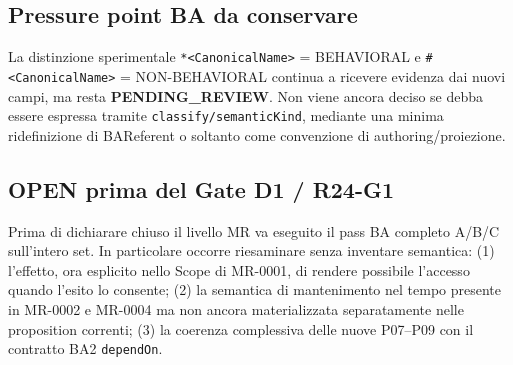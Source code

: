 \documentclass[11pt,a4paper]{article}
\newcommand{\bbeh}[1]{\texttt{*<#1>}}
\newcommand{\bnon}[1]{\texttt{\#<#1>}}
\begin{document}
\subsection*{Pressure point BA da conservare}
La distinzione sperimentale \bbeh{CanonicalName} = BEHAVIORAL e \bnon{CanonicalName} = NON-BEHAVIORAL continua a ricevere evidenza dai nuovi campi, ma resta \textbf{PENDING\_REVIEW}. Non viene ancora deciso se debba essere espressa tramite \texttt{classify/semanticKind}, mediante una minima ridefinizione di BAReferent o soltanto come convenzione di authoring/proiezione.

\subsection*{OPEN prima del Gate D1 / R24-G1}
Prima di dichiarare chiuso il livello MR va eseguito il pass BA completo A/B/C sull'intero set. In particolare occorre riesaminare senza inventare semantica: (1) l'effetto, ora esplicito nello Scope di MR-0001, di rendere possibile l'accesso quando l'esito lo consente; (2) la semantica di mantenimento nel tempo presente in MR-0002 e MR-0004 ma non ancora materializzata separatamente nelle proposition correnti; (3) la coerenza complessiva delle nuove P07--P09 con il contratto BA2 \texttt{dependOn}.
\end{document}
